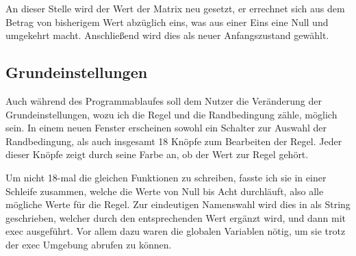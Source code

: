 \documentclass{scrartcl}
\begin{document}
An dieser Stelle wird der Wert der Matrix neu gesetzt, er errechnet sich aus dem Betrag von bisherigem Wert abzüglich eins, was aus einer Eins eine Null und umgekehrt macht.
Anschließend wird dies als neuer Anfangszustand gewählt.

\subsection{Grundeinstellungen}
Auch während des Programmablaufes soll dem Nutzer die Veränderung der Grundeinstellungen, wozu ich die Regel und die Randbedingung zähle, möglich sein. In einem neuen Fenster erscheinen sowohl ein Schalter zur Auswahl der Randbedingung, als auch insgesamt 18 Knöpfe zum Bearbeiten der Regel. Jeder dieser Knöpfe zeigt durch seine Farbe an, ob der Wert zur Regel gehört. 

Um nicht 18-mal die gleichen Funktionen zu schreiben, fasste ich sie in einer Schleife zusammen, welche die Werte von Null bis Acht durchläuft, also alle mögliche Werte für die Regel. Zur eindeutigen Namenswahl wird dies in als String geschrieben, welcher durch den entsprechenden Wert ergänzt wird, und dann mit exec ausgeführt. Vor allem dazu waren die globalen Variablen nötig, um sie trotz der exec Umgebung abrufen zu können.
\end{document}
